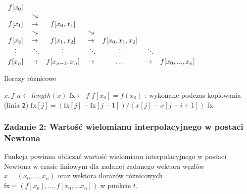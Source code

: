 \documentclass[11pt]{article}
\begin{document}
        \newcommand{\rotatedarrow}{\rotatebox[origin=c]{-30}{$\rightarrow$}}
        \newcommand{\rotateddots}{\rotatebox[origin=c]{45}{$\vdots$}}

        \begin{center}
        \begin{math}
            \begin{array}{cccccccc}
                f[x_0] \\
                & \rotatedarrow \\
                f[x_1] & \rightarrow & f[x_0, x_1] \\
                & \rotatedarrow & & \rotatedarrow \\
                f[x_2] & \rightarrow & f[x_1, x_2] & \rightarrow & f[x_0, x_1, x_2] \\
                \vdots & \rotateddots & \vdots & \rotateddots & \vdots & \rotateddots \\
                f[x_n] & \rightarrow & f[x_{n-1}, x_n] & \rightarrow & \hdots & \rightarrow & f[x_0, ..., x_n]
            \end{array}
        \end{math}
        \end{center}

        \newpage

        \begin{algorithm}[h!]
        \caption{Ilorazy różnicowe}\label{alg:differential_quotients}
        \begin{algorithmic}[1]
            \Require $x, f$
            \State $n \gets length(x)$
            \State $\text{fx} \gets f$
                \Comment $f[x_0] = f(x_0)$ : wykonane podczas kopiowania (linia \texttt{2})
                    \State $\text{fx}[j] = (\text{fx}[j] - \text{fx}[j-1]) / (x[j] - x[j-i+1])$
                \EndFor
            \EndFor
            \State \Return fx
        \end{algorithmic}
        \end{algorithm}

        \noindent \newline

        \subsubsection*{Zadanie 2: Wartość wielomianu interpolacyjnego w postaci Newtona}
        Funkcja powinna obliczać wartość wielomianu interpolacyjnego w postaci Newtona w czasie liniowym dla zadanej
        zadanego wektora węzłów $x = (x_0, ..., x_n)$ oraz wektora ilorazów różnicowych
        $\text{fx} = (f[x_0], ..., f[x_0, ... x_n])$ w punkcie $t$.
\end{document}
